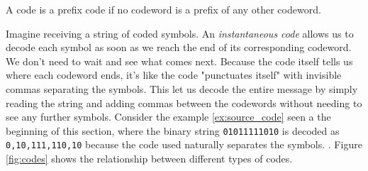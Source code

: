 \begin{definition}\label{def:prefix_code}
    A  code is a prefix code if no codeword is a prefix of any other codeword.
\end{definition}

\noindent Imagine receiving a string of coded symbols. An \emph{instantaneous code} allows us to decode each symbol as soon as we reach the end of its corresponding codeword. We don't need to wait and see what comes next. Because the code itself tells us where each codeword ends, it's like the code "punctuates itself" with invisible commas separating the symbols.  This let us decode the entire message by simply reading the string and adding commas between the codewords without needing to see any further symbols. Consider the example \ref{ex:source_code} seen a the beginning of this section, where the binary string \texttt{01011111010} is decoded as \texttt{0,10,111,110,10} because the code used naturally separates the symbols. \cite{ElementsofInformationTheory}. Figure \ref{fig:codes} shows the relationship between different types of codes.


